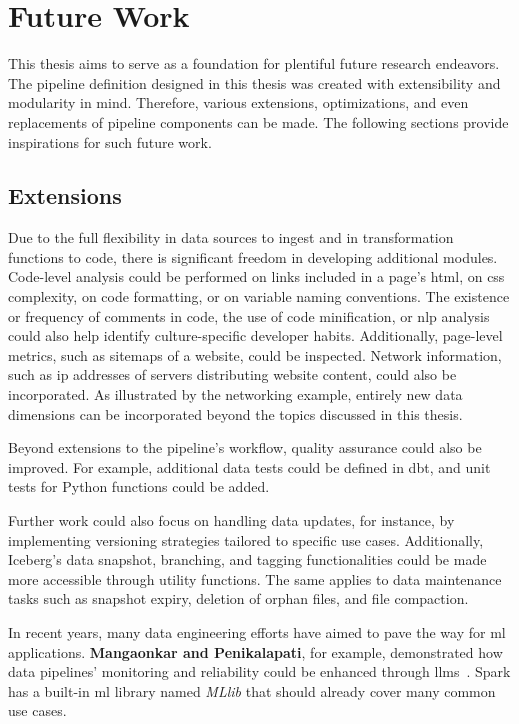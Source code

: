 \section{Future Work}
\label{sec:future_work}

This thesis aims to serve as a foundation for plentiful future research endeavors.
The pipeline definition designed in this thesis was created with extensibility and modularity in mind.
Therefore, various extensions, optimizations, and even replacements of pipeline components can be made.
The following sections provide inspirations for such future work.

\subsection{Extensions}
\label{sec:future-work-extensions}

Due to the full flexibility in data sources to ingest and in transformation functions to code, there is significant freedom in developing additional modules.
Code-level analysis could be performed on links included in a page's \ac{html}, on \ac{css} complexity, on code formatting, or on variable naming conventions.
The existence or frequency of comments in code, the use of code minification, or \ac{nlp} analysis could also help identify culture-specific developer habits.
Additionally, page-level metrics, such as sitemaps of a website, could be inspected.
Network information, such as \ac{ip} addresses of servers distributing website content, could also be incorporated.
As illustrated by the networking example, entirely new data dimensions can be incorporated beyond the topics discussed in this thesis.

Beyond extensions to the pipeline's workflow, quality assurance could also be improved.
For example, additional data tests could be defined in dbt, and unit tests for Python functions could be added.

Further work could also focus on handling data updates, for instance, by implementing versioning strategies tailored to specific use cases.
Additionally, Iceberg's data snapshot, branching, and tagging functionalities could be made more accessible through utility functions.
The same applies to data maintenance tasks such as snapshot expiry, deletion of orphan files, and file compaction.

In recent years, many data engineering efforts have aimed to pave the way for \ac{ml} applications.
\textbf{Mangaonkar and Penikalapati}, for example, demonstrated how data pipelines' monitoring and reliability could be enhanced through \acp{llm}~\cite{Mangaonkar2024}.
Spark has a built-in \ac{ml} library named \textit{MLlib} that should already cover many common use cases.


